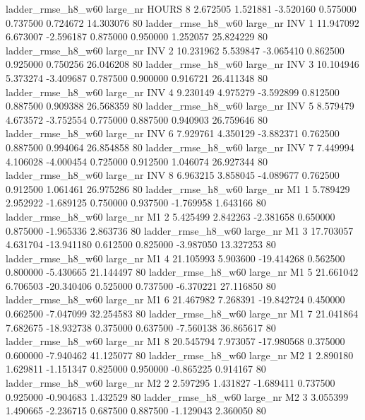  ladder_rmse_h8_w60   large_nr    HOURS                 8  2.672505  1.521881  -3.520160 0.575000 0.737500  0.724672   14.303076 80
 ladder_rmse_h8_w60   large_nr      INV                 1 11.947092  6.673007  -2.596187 0.875000 0.950000  1.252057   25.824229 80
 ladder_rmse_h8_w60   large_nr      INV                 2 10.231962  5.539847  -3.065410 0.862500 0.925000  0.750256   26.046208 80
 ladder_rmse_h8_w60   large_nr      INV                 3 10.104946  5.373274  -3.409687 0.787500 0.900000  0.916721   26.411348 80
 ladder_rmse_h8_w60   large_nr      INV                 4  9.230149  4.975279  -3.592899 0.812500 0.887500  0.909388   26.568359 80
 ladder_rmse_h8_w60   large_nr      INV                 5  8.579479  4.673572  -3.752554 0.775000 0.887500  0.940903   26.759646 80
 ladder_rmse_h8_w60   large_nr      INV                 6  7.929761  4.350129  -3.882371 0.762500 0.887500  0.994064   26.854858 80
 ladder_rmse_h8_w60   large_nr      INV                 7  7.449994  4.106028  -4.000454 0.725000 0.912500  1.046074   26.927344 80
 ladder_rmse_h8_w60   large_nr      INV                 8  6.963215  3.858045  -4.089677 0.762500 0.912500  1.061461   26.975286 80
 ladder_rmse_h8_w60   large_nr       M1                 1  5.789429  2.952922  -1.689125 0.750000 0.937500 -1.769958    1.643166 80
 ladder_rmse_h8_w60   large_nr       M1                 2  5.425499  2.842263  -2.381658 0.650000 0.875000 -1.965336    2.863736 80
 ladder_rmse_h8_w60   large_nr       M1                 3 17.703057  4.631704 -13.941180 0.612500 0.825000 -3.987050   13.327253 80
 ladder_rmse_h8_w60   large_nr       M1                 4 21.105993  5.903600 -19.414268 0.562500 0.800000 -5.430665   21.144497 80
 ladder_rmse_h8_w60   large_nr       M1                 5 21.661042  6.706503 -20.340406 0.525000 0.737500 -6.370221   27.116850 80
 ladder_rmse_h8_w60   large_nr       M1                 6 21.467982  7.268391 -19.842724 0.450000 0.662500 -7.047099   32.254583 80
 ladder_rmse_h8_w60   large_nr       M1                 7 21.041864  7.682675 -18.932738 0.375000 0.637500 -7.560138   36.865617 80
 ladder_rmse_h8_w60   large_nr       M1                 8 20.545794  7.973057 -17.980568 0.375000 0.600000 -7.940462   41.125077 80
 ladder_rmse_h8_w60   large_nr       M2                 1  2.890180  1.629811  -1.151347 0.825000 0.950000 -0.865225    0.914167 80
 ladder_rmse_h8_w60   large_nr       M2                 2  2.597295  1.431827  -1.689411 0.737500 0.925000 -0.904683    1.432529 80
 ladder_rmse_h8_w60   large_nr       M2                 3  3.055399  1.490665  -2.236715 0.687500 0.887500 -1.129043    2.360050 80
